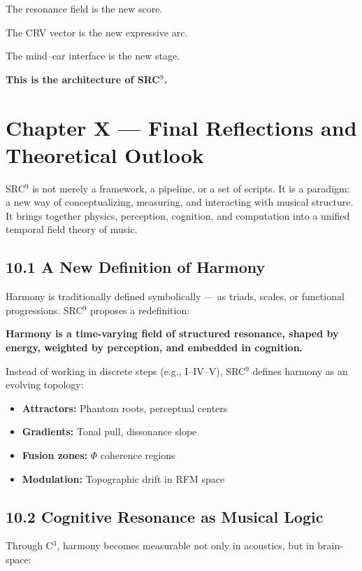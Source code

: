 The resonance field is the new score.

The CRV vector is the new expressive arc.

The mind–ear interface is the new stage.

\textbf{This is the architecture of SRC$^{9}$.}

\section*{Chapter X — Final Reflections and Theoretical Outlook}

SRC$^{9}$ is not merely a framework, a pipeline, or a set of scripts. It is a paradigm: a new way of conceptualizing, measuring, and interacting with musical structure. It brings together physics, perception, cognition, and computation into a unified temporal field theory of music.

\subsection*{10.1 A New Definition of Harmony}

Harmony is traditionally defined symbolically — as triads, scales, or functional progressions. SRC$^{9}$ proposes a redefinition:

\textbf{Harmony is a time-varying field of structured resonance, shaped by energy, weighted by perception, and embedded in cognition.}

Instead of working in discrete steps (e.g., I–IV–V), SRC$^{9}$ defines harmony as an evolving topology:

\begin{itemize}
    \item \textbf{Attractors:} Phantom roots, perceptual centers
    \item \textbf{Gradients:} Tonal pull, dissonance slope
    \item \textbf{Fusion zones:} $\Phi$ coherence regions
    \item \textbf{Modulation:} Topographic drift in RFM space
\end{itemize}

\subsection*{10.2 Cognitive Resonance as Musical Logic}

Through C$^{3}$, harmony becomes measurable not only in acoustics, but in brain-space:

